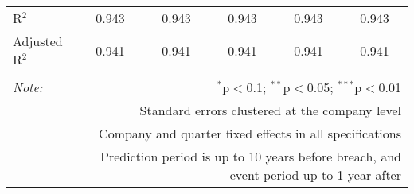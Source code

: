 \begin{table}[!htbp]
\begin{tabular}{@{\extracolsep{5pt}}lccccc}
R$^{2}$ & 0.943 & 0.943 & 0.943 & 0.943 & 0.943 \\ 
Adjusted R$^{2}$ & 0.941 & 0.941 & 0.941 & 0.941 & 0.941 \\ 
\hline 
\hline \\[-1.8ex] 
\textit{Note:}  & \multicolumn{5}{r}{$^{*}$p$<$0.1; $^{**}$p$<$0.05; $^{***}$p$<$0.01} \\ 
 & \multicolumn{5}{r}{Standard errors clustered at the company level} \\ 
 & \multicolumn{5}{r}{Company and quarter fixed effects in all specifications} \\ 
 & \multicolumn{5}{r}{Prediction period is up to 10 years before breach, and event period up to 1 year after} \\ 
\end{tabular} 
\end{table} 
